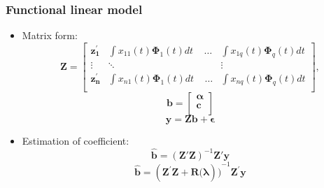 \documentclass[
	9pt, %
]{beamer}
\begin{document}
\begin{frame}
	\frametitle{Functional linear model}
	\begin{itemize}
	\item Matrix form:
	$$\mathbf{Z}=\left[\begin{matrix}\mathbf{z}_\mathbf{1}^\prime&\int{x_{11}\left(t\right)\bm{\Phi}_{1}\left(t\right)dt}\ \ \ \ \ \ldots&\int{x_{1q}\left(t\right)\bm{\Phi}_{q}\left(t\right)dt}\\\vdots&\ddots\ &\vdots\\\mathbf{z}_\mathbf{n}^\prime&\int{x_{n1}\left(t\right)\bm{\Phi}_{1}\left(t\right)dt\ }\ \ \ \ \ldots&\int{x_{nq}\left(t\right)\bm{\Phi}_{q}\left(t\right)dt}\\\end{matrix}\right],$$
	$$\bm{b}=\left[\begin{matrix}\bm{\alpha}\\\bm{c}\\\end{matrix}\right]$$
	$$\bm{y}=\bm{Zb}+\bm{\epsilon}$$
	\item Estimation of coefficient:
	$$\hat{\bm{b}}=\left(\bm{Z}'\bm{Z}\right)^{-{1}}\bm{Z}'\bm{y}$$
	$$\hat{\bm{b}}={\left(\bm{Z}^\prime\bm{Z}+\bm{R}(\bm{\lambda}\right))}^{-{1}}\bm{Z}^\prime\bm{y}$$

	\end{itemize}
	\end{frame}
\end{document}

